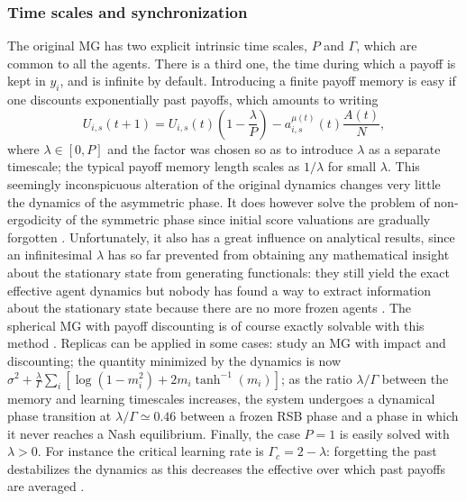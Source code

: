 \documentclass[aps,twocolumn,nofootinbib,sortedaddress,reprint]{revtex4-1}
\begin{document}
\subsubsection{Time scales and synchronization}


The original MG has two explicit intrinsic time scales, $P$ and
$\Gamma$, which are common to all the agents. There is a third one,
the time during which a payoff is kept in $y_i$, and is infinite by
default. Introducing a finite payoff memory  is easy if one discounts exponentially
past payoffs, which amounts to writing
\begin{equation}
U_{i,s}(t+1)=U_{i,s}(t)\left(1-\frac{\lambda}{P}\right)-a_{i,s}^{\mu(t)}(t)\frac{A(t)}{N},
\end{equation}
where $\lambda\in[0,P]$ and the factor was chosen so as to introduce
$\lambda$ as a separate timescale; the typical payoff memory length
scales as $1/\lambda$ for small $\lambda$. This seemingly
inconspicuous alteration of the original dynamics changes very little
the dynamics of the asymmetric phase. It does however solve the
problem of non-ergodicity of the symmetric phase since initial score
valuations are gradually forgotten \cite{CDMP05}. Unfortunately, it
also has a great influence on analytical results, since an
infinitesimal $\lambda$ has so far prevented from obtaining any mathematical insight about the stationary state from
generating functionals: they still yield the exact effective agent
dynamics but nobody has found a way to extract information about the
stationary state because there are no more frozen agents
\cite{CDMP05,demartino2011nonergodic}. The spherical MG with payoff
discounting is of course exactly solvable with this method
\cite{bladon2009spherical,demartino2011nonergodic}. Replicas can be
applied in some cases: \textcite{marsili2001learning} study an MG with
impact and discounting; the quantity minimized by the dynamics is now
$\sigma^ 2+\frac{\lambda}{\Gamma}\sum_i
[\log(1-m_i^2)+2m_i\tanh^{-1}(m_i)]$; as the ratio $\lambda/\Gamma$
 between the memory and learning timescales increases,
the system undergoes a dynamical phase transition at
$\lambda/\Gamma\simeq 0.46$ between a frozen RSB phase and a phase in
which it never reaches a Nash equilibrium. Finally, the case $P=1$ is
easily solved with $\lambda>0$. For instance the critical learning
rate is $\Gamma_c=2-\lambda$: forgetting the past destabilizes the
dynamics as this decreases the effective over which past payoffs are averaged \cite{mosetti2006minority}.
\end{document}
